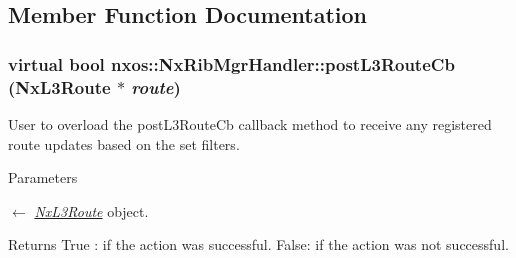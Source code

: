 \subsection{Member Function Documentation}
\hypertarget{classnxos_1_1NxRibMgrHandler_a1b742d50365fdece0ea47eb38300f7de}{
\subsubsection[{postL3RouteCb}]{\setlength{\rightskip}{0pt plus 5cm}virtual bool nxos::NxRibMgrHandler::postL3RouteCb ({\bf NxL3Route} $\ast$ {\em route})}}
\label{classnxos_1_1NxRibMgrHandler_a1b742d50365fdece0ea47eb38300f7de}
User to overload the postL3RouteCb callback method to receive any registered route updates based on the set filters. 
\begin{DoxyParams}{Parameters}
\item[\mbox{$\leftarrow$} {\em \hyperlink{classnxos_1_1NxL3Route}{NxL3Route}}]object.\end{DoxyParams}
\begin{DoxyReturn}{Returns}
True : if the action was successful. False: if the action was not successful.
\end{DoxyReturn}

